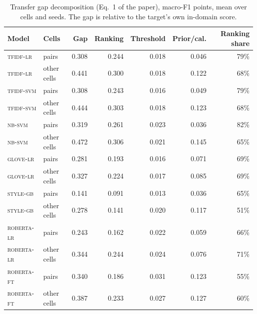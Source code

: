 \begin{table}[t]
\centering
\caption{Transfer gap decomposition (Eq.~1 of the paper), macro-F1 points, mean over cells and seeds. The gap is relative to the target's own in-domain score.}\label{tab:decomp}
\small
\begin{tabular}{@{}llrrrrr@{}}
\toprule
Model & Cells & Gap & Ranking & Threshold & Prior/cal. & Ranking share \\
\midrule
\textsc{tfidf-lr} & pairs & 0.308 & 0.244 & 0.018 & 0.046 & 79\% \\
\textsc{tfidf-lr} & other cells & 0.441 & 0.300 & 0.018 & 0.122 & 68\% \\
\textsc{tfidf-svm} & pairs & 0.308 & 0.243 & 0.016 & 0.049 & 79\% \\
\textsc{tfidf-svm} & other cells & 0.444 & 0.303 & 0.018 & 0.123 & 68\% \\
\textsc{nb-svm} & pairs & 0.319 & 0.261 & 0.023 & 0.036 & 82\% \\
\textsc{nb-svm} & other cells & 0.472 & 0.306 & 0.021 & 0.145 & 65\% \\
\textsc{glove-lr} & pairs & 0.281 & 0.193 & 0.016 & 0.071 & 69\% \\
\textsc{glove-lr} & other cells & 0.327 & 0.224 & 0.017 & 0.085 & 69\% \\
\textsc{style-gb} & pairs & 0.141 & 0.091 & 0.013 & 0.036 & 65\% \\
\textsc{style-gb} & other cells & 0.278 & 0.141 & 0.020 & 0.117 & 51\% \\
\textsc{roberta-lr} & pairs & 0.243 & 0.162 & 0.022 & 0.059 & 66\% \\
\textsc{roberta-lr} & other cells & 0.344 & 0.244 & 0.024 & 0.076 & 71\% \\
\textsc{roberta-ft} & pairs & 0.340 & 0.186 & 0.031 & 0.123 & 55\% \\
\textsc{roberta-ft} & other cells & 0.387 & 0.233 & 0.027 & 0.127 & 60\% \\
\bottomrule
\end{tabular}
\end{table}
